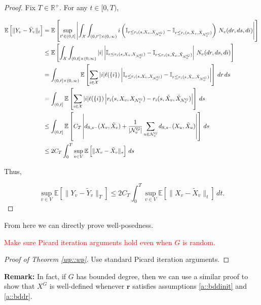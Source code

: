 \documentclass[12pt]{article}
\newcommand{\mb}{\mathbb}
\newcommand{\mc}{\mathcal}
\newcommand{\te}{\text}
\newcommand{\tr}{\textcolor{red}}
\newcommand{\remark}{\textbf{Remark: }}
\newcommand{\ex}[1]{\mb{E}\left[#1\right]}			%
\newcommand{\sta}{\mc{X}}							%
\newcommand{\gneigh}[2]{\mc{N}^{#1}_{#2}}			%
\newcommand{\Xf}{X}									%
\newcommand{\poiss}{N}								%
\newcommand{\Sm}{\ell}								%
\newcommand{\rate}{r}								%
\newcommand{\stmet}[1]{
\ifstrempty{#1}{
	d_{\te{S}}}{
	d_{\te{S},#1}}}									%
\newcommand{\poissv}[1]{_{#1}}						%
\newcommand{\vind}[1]{_{#1}}						%
\newcommand{\gind}[1]{^{#1}}						%
\newcommand{\stpara}[1]{_{#1}}						%
\newcommand{\tpara}[1]{_{#1}}						%
\newcommand{\rateset}{\mathbf{\rate}}				%
\newcommand{\jumpbd}[1]{C_{#1}}						%
\newcommand{\tmepro}[3]{
\ifstrempty{#3}{
	(#1,#2)}{
	(#1,#2,#3)}}									%
\newcommand{\Xg}{Y}									%
\newcommand{\alt}[1]{\tilde{#1}}					%
\begin{document}
\begin{proof}
Fix \(T \in \mb{R}^+\). For any \(t \in [0,T)\),

\begin{align*}
\ex{\|\Xg\vind{v} - \alt{\Xg}\vind{v}\|\tpara{t}} &= \ex{\sup_{t' \in (0,t]}\left|\int_\sta\int_{(0,t']\times (0,\infty)} i\left(\mb{I}_{r \leq \rate\stpara{i}\tmepro{s}{\Xf\vind{v}}{\Xf\vind{\gneigh{G}{v}}}} - \mb{I}_{r \leq \rate\stpara{i}\tmepro{s}{\alt{\Xf}\vind{v}}{\alt{\Xf}\vind{\gneigh{G}{v}}}} \right)\,\poiss\poissv{v}(dr,ds,di)\right|}\\
&\leq \ex{\int_\sta\int_{(0,t]\times (0,\infty)} |i|\left|\mb{I}_{r \leq \rate\stpara{i}\tmepro{s}{\Xf\vind{v}}{\Xf\vind{\gneigh{G}{v}}}} - \mb{I}_{r \leq \rate\stpara{i}\tmepro{s}{\alt{\Xf}\vind{v}}{\alt{\Xf}\vind{\gneigh{G}{v}}}} \right|\,\poiss\poissv{v}(dr,ds,di)}\\
&= \int_{(0,t]\times (0,\infty)}\ex{\sum_{i\in \sta}|i|\Sm(\{i\})\left|\mb{I}_{r \leq \rate\stpara{i}\tmepro{s}{\Xf\vind{v}}{\Xf\vind{\gneigh{G}{v}}}} - \mb{I}_{r \leq \rate\stpara{i}\tmepro{s}{\alt{\Xf}\vind{v}}{\alt{\Xf}\vind{\gneigh{G}{v}}}}\right|}\,dr\,ds\\
&= \int_{(0,t]}\ex{\sum_{i\in \sta}|i|\Sm(\{i\})\left|\rate\stpara{i}\tmepro{s}{\Xf\vind{v}}{\Xf\vind{\gneigh{G}{v}}} - \rate\stpara{i}\tmepro{s}{\alt{\Xf}\vind{v}}{\alt{\Xf}\vind{\gneigh{G}{v}}}\right|}\,ds\\
&\leq \int_{(0,t]}\ex{\jumpbd{T}\left|\stmet{s-}(\Xf\vind{v},\alt{\Xf}\vind{v}) + \frac{1}{|\gneigh{G}{v}|}\sum_{u\in \gneigh{G}{v}} \stmet{s-}(\Xf\vind{u},\alt{\Xf}\vind{u}) \right|}\,ds\\
&\leq 2\jumpbd{T} \int_0^T \sup_{v \in V} \ex{\|\Xf\vind{v} - \alt{\Xf}\vind{v}\|\tpara{s}}\,ds
\end{align*}

Thus,

\[\sup_{v\in V}\ex{\|\Xg\vind{v} - \alt{\Xg}\vind{v}\|\tpara{T}} \leq 2\jumpbd{T} \int_0^T \sup_{v \in V} \ex{\|\Xf\vind{v} - \alt{\Xf}\vind{v}\|\tpara{t}}\,dt.\]
\end{proof}

From here we can directly prove well-posedness.

\tr{Make sure Picard iteration arguments hold even when \(G\) is random.}
\begin{proof}[Proof of Theorem \ref{wp::wp}]
Use standard Picard iteration arguments.
\end{proof}

\remark In fact, if \(G\) has bounded degree, then we can use a similar proof to show that \(\Xf\gind{G}\) is well-defined whenever \(\rateset\) satisfies assumptions \ref{a::bddinit} and \ref{a::bddr}.
\end{document}
